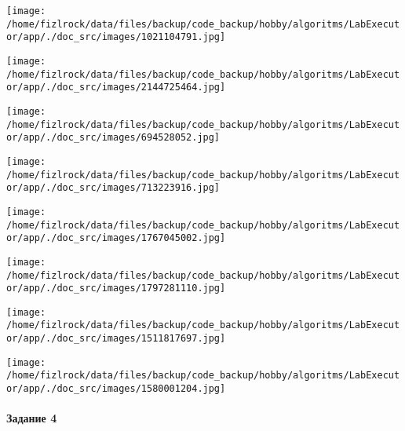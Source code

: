 \documentclass[a4paper, 12pt]{article}
\begin{document}
\texttt{[image: /home/fizlrock/data/files/backup/code\_backup/hobby/algoritms/LabExecutor/app/./doc\_src/images/1021104791.jpg]}

\texttt{[image: /home/fizlrock/data/files/backup/code\_backup/hobby/algoritms/LabExecutor/app/./doc\_src/images/2144725464.jpg]}

\texttt{[image: /home/fizlrock/data/files/backup/code\_backup/hobby/algoritms/LabExecutor/app/./doc\_src/images/694528052.jpg]}

\texttt{[image: /home/fizlrock/data/files/backup/code\_backup/hobby/algoritms/LabExecutor/app/./doc\_src/images/713223916.jpg]}

\texttt{[image: /home/fizlrock/data/files/backup/code\_backup/hobby/algoritms/LabExecutor/app/./doc\_src/images/1767045002.jpg]}

\texttt{[image: /home/fizlrock/data/files/backup/code\_backup/hobby/algoritms/LabExecutor/app/./doc\_src/images/1797281110.jpg]}

\texttt{[image: /home/fizlrock/data/files/backup/code\_backup/hobby/algoritms/LabExecutor/app/./doc\_src/images/1511817697.jpg]}

\texttt{[image: /home/fizlrock/data/files/backup/code\_backup/hobby/algoritms/LabExecutor/app/./doc\_src/images/1580001204.jpg]}
\pagebreak
\paragraph{Задание 4}
\end{document}
